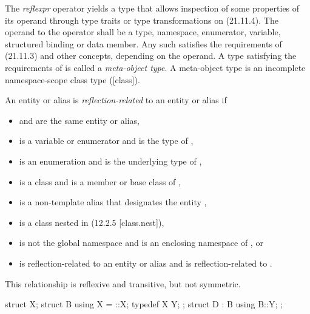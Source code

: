\begin{std.txt}\color{addclr}

    The \emph{reflexpr} operator yields a type  that allows inspection
    of some properties of its operand through type traits or type transformations
    on  (21.11.4).  The operand to the  operator shall
    be a type, namespace, enumerator, variable, structured binding or data
    member.  Any such  satisfies the requirements of
     (21.11.3) and other  concepts,
    depending on the operand.  A type satisfying the requirements of
     is called a \emph{meta-object type}.  A meta-object
    type is an incomplete namespace-scope class type ([class]).

    An entity or alias  is \emph{reflection-related} to an entity or
    alias  if

    \begin{itemize}
      \item {} and  are the same entity or alias,
      \item {} is a variable or enumerator and  is the type of ,
      \item {} is an enumeration and  is the underlying type of ,
      \item {} is a class and  is a member or base class of ,
      \item {} is a non-template alias that designates the entity ,
      \item {} is a class nested in  (12.2.5 [class.nest]),
      \item {} is not the global namespace and  is an enclosing namespace of , or
      \item {} is reflection-related to an entity or alias  and  is reflection-related to .
    \end{itemize}

\begin{note}
This relationship is reflexive and transitive, but not symmetric.
\end{note}

\begin{example}
\begin{codeblock}
struct X;
struct B  {
   using X = ::X;
   typedef X Y;
};
struct D : B {
   using B::Y;
};
\end{codeblock}


\end{example}
\end{std.txt}
